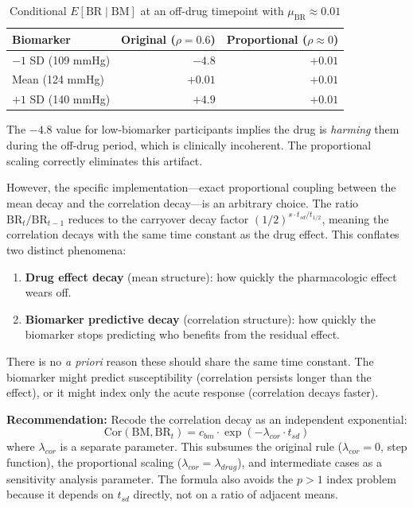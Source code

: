 \documentclass[11pt]{article}
\begin{document}
\begin{table}[h]
\centering
\caption{Conditional $E[\text{BR} \mid \text{BM}]$ at an
  off-drug timepoint with $\mu_{\text{BR}} \approx 0.01$}
\begin{tabular}{lrr}
\toprule
Biomarker & Original ($\rho = 0.6$) &
  Proportional ($\rho \approx 0$) \\
\midrule
$-1$ SD (109 mmHg) & $-4.8$ & $+0.01$ \\
Mean (124 mmHg) & $+0.01$ & $+0.01$ \\
$+1$ SD (140 mmHg) & $+4.9$ & $+0.01$ \\
\bottomrule
\end{tabular}
\end{table}

The $-4.8$ value for low-biomarker participants implies the
drug is \emph{harming} them during the off-drug period, which
is clinically incoherent. The proportional scaling correctly
eliminates this artifact.

However, the specific implementation---exact proportional
coupling between the mean decay and the correlation decay---is
an arbitrary choice. The ratio
$\text{BR}_t / \text{BR}_{t-1}$ reduces to the carryover
decay factor $(1/2)^{s \cdot t_{sd} / t_{1/2}}$, meaning
the correlation decays with the same time constant as the
drug effect. This conflates two distinct phenomena:

\begin{enumerate}
\item \textbf{Drug effect decay} (mean structure): how
  quickly the pharmacologic effect wears off.
\item \textbf{Biomarker predictive decay} (correlation
  structure): how quickly the biomarker stops predicting
  who benefits from the residual effect.
\end{enumerate}

There is no \emph{a priori} reason these should share the
same time constant. The biomarker might predict
susceptibility (correlation persists longer than the effect),
or it might index only the acute response (correlation
decays faster).

\textbf{Recommendation:} Recode the correlation decay as an
independent exponential:
\[
\text{Cor}(\text{BM}, \text{BR}_t) =
  c_{bm} \cdot \exp(-\lambda_{cor} \cdot t_{sd})
\]
where $\lambda_{cor}$ is a separate parameter. This
subsumes the original rule ($\lambda_{cor} = 0$, step
function), the proportional scaling
($\lambda_{cor} = \lambda_{drug}$), and intermediate
cases as a sensitivity analysis parameter. The formula
also avoids the $p > 1$ index problem because it depends
on $t_{sd}$ directly, not on a ratio of adjacent means.
\end{document}

